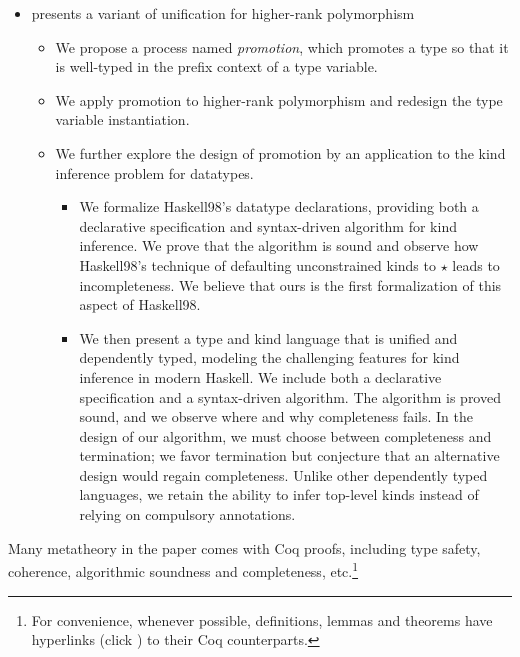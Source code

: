 \begin{itemize}
\item {} presents a variant of unification for higher-rank polymorphism
  \begin{itemize}
  \item We propose a process named \textit{promotion}, which promotes a type so
    that it is well-typed in the prefix context of a type variable.
  \item We apply promotion to higher-rank polymorphism and
    redesign the type variable instantiation.
  \item We further explore the design of promotion by an application to the kind
  inference problem for datatypes.
  \begin{itemize}
  \item We formalize Haskell98’s datatype declarations, providing both a
    declarative specification and syntax-driven algorithm for kind inference. We
    prove that the algorithm is sound and observe how Haskell98’s technique of
    defaulting unconstrained kinds to $\star$ leads to incompleteness. We
    believe that ours is the first formalization of this aspect of Haskell98.
  \item We then present a type and kind language that is unified and dependently
    typed, modeling the challenging features for kind inference in modern
    Haskell. We include both a declarative specification and a syntax-driven
    algorithm. The algorithm is proved sound, and we observe where and why
    completeness fails. In the design of our algorithm, we must choose between
    completeness and termination; we favor termination but conjecture that an
    alternative design would regain completeness. Unlike other dependently typed
    languages, we retain the ability to infer top-level kinds instead of relying
    on compulsory annotations.
  \end{itemize}
  \end{itemize}
  
\end{itemize}

Many metatheory in the paper comes with Coq proofs, including type
safety, coherence, algorithmic soundness and completeness, etc.\footnote{For
  convenience, whenever possible, definitions, lemmas and theorems have hyperlinks (click
  \leftpointright) to their Coq counterparts. }

